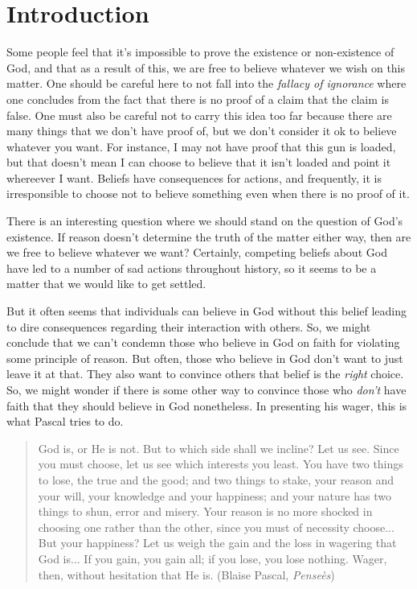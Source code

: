 \section{Introduction}
Some people feel that it's impossible to prove the existence or non-existence of God, and that as a result of this, we are free to believe whatever we wish on this matter.  One should be careful here to not fall into the \textit{fallacy of ignorance} where one concludes from the fact that there is no proof of a claim that the claim is false. One must also be careful not to carry this idea too far because there are many things that we don't have proof of, but we don't consider it ok to believe whatever you want.  For instance, I may not have proof that this gun is loaded, but that doesn't mean I can choose to believe that it isn't loaded and point it whereever I want.  Beliefs have consequences for actions, and frequently, it is irresponsible to choose not to believe something even when there is no proof of it.

There is an interesting question where we should stand on the question of God's existence. If reason doesn't determine the truth of the matter either way, then are we free to believe whatever we want?  Certainly, competing beliefs about God have led to a number of sad actions throughout history, so it seems to be a matter that we would like to get settled.

But it often seems that individuals can believe in God without this belief leading to dire consequences regarding their interaction with others.  So, we might conclude that we can't condemn those who believe in God on faith for violating some principle of reason. But often, those who believe in God don't want to just leave it at that.  They also want to convince others that belief is the \textit{right} choice. So, we might wonder if there is some other way to convince those who \textit{don't} have faith that they should believe in God nonetheless.  In presenting his wager, this is what Pascal tries to do.

\begin{quotation}
    God is, or He is not. But to which side shall we incline? Let us see. Since you must choose, let us see which interests you least. You have two things to lose, the true and the good; and two things to stake, your reason and your will, your knowledge and your happiness; and your nature has two things to shun, error and misery. Your reason is no more shocked in choosing one rather than the other, since you must of necessity choose... But your happiness? Let us weigh the gain and the loss in wagering that God is... If you gain, you gain all; if you lose, you lose nothing. Wager, then, without hesitation that He is. (Blaise Pascal, \textit{Pense\`es})
  \end{quotation}


